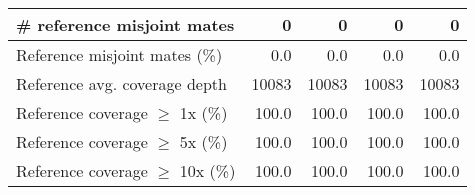 \documentclass[12pt,a4paper]{article}
\begin{document}
\begin{table}[ht]
\begin{center}
\begin{tabular}{|l*{4}{|r}|}
\# reference misjoint mates & 0 & 0 & 0 & 0 \\ \hline
Reference misjoint mates (\%) & 0.0 & 0.0 & 0.0 & 0.0 \\ \hline
Reference avg. coverage depth & 10083 & 10083 & 10083 & 10083 \\ \hline
Reference coverage $\geq$ 1x (\%) & 100.0 & 100.0 & 100.0 & 100.0 \\ \hline
Reference coverage $\geq$ 5x (\%) & 100.0 & 100.0 & 100.0 & 100.0 \\ \hline
Reference coverage $\geq$ 10x (\%) & 100.0 & 100.0 & 100.0 & 100.0 \\ \hline
\end{tabular}
\end{center}
\end{table}
\end{document}
